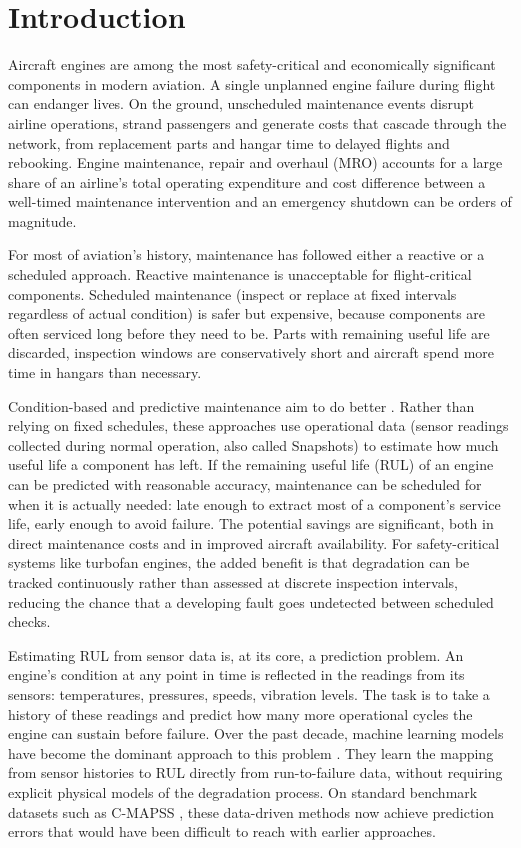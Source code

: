 \cleardoublepage

\chapter{Introduction}
\label{Chapter:Introduction}
Aircraft engines are among the most safety-critical and economically significant components in modern aviation. A single unplanned engine failure during flight can endanger lives. On the ground, unscheduled maintenance events disrupt airline operations, strand passengers and generate costs that cascade through the network, from replacement parts and hangar time to delayed flights and rebooking. Engine maintenance, repair and overhaul (MRO) accounts for a large share of an airline's total operating expenditure and cost difference between a well-timed maintenance intervention and an emergency shutdown can be orders of magnitude. 

For most of aviation's history, maintenance has followed either a reactive or a scheduled approach. Reactive maintenance is unacceptable for flight-critical components. Scheduled maintenance (inspect or replace at fixed intervals regardless of actual condition) is safer but expensive, because components are often serviced long before they need to be. Parts with remaining useful life are discarded, inspection windows are conservatively short and aircraft spend more time in hangars than necessary. 

Condition-based and predictive maintenance aim to do better \citep{Jardine2006}. Rather than relying on fixed schedules, these approaches use operational data (sensor readings collected during normal operation, also called Snapshots) to estimate how much useful life a component has left. If the remaining useful life (RUL) of an engine can be predicted with reasonable accuracy, maintenance can be scheduled for when it is actually needed: late enough to extract most of a component's service life, early enough to avoid failure. The potential savings are significant, both in direct maintenance costs and in improved aircraft availability. For safety-critical systems like turbofan engines, the added benefit is that degradation can be tracked continuously rather than assessed at discrete inspection intervals, reducing the chance that a developing fault goes undetected between scheduled checks.

Estimating RUL from sensor data is, at its core, a prediction problem. An engine's condition at any point in time is reflected in the readings from its sensors: temperatures, pressures, speeds, vibration levels. The task is to take a history of these readings and predict how many more operational cycles the engine can sustain before failure. Over the past decade, machine learning models have become the dominant approach to this problem \citep{Li2018,Zheng2017}. They learn the mapping from sensor histories to RUL directly from run-to-failure data, without requiring explicit physical models of the degradation process. On standard benchmark datasets such as C-MAPSS \citep{Saxena2008}, these data-driven methods now achieve prediction errors that would have been difficult to reach with earlier approaches.

